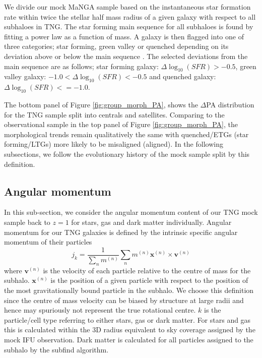 \documentclass[fleqn,usenatbib]{mnras}
\begin{document}
We divide our mock MaNGA sample based on the instantaneous star formation rate within twice the stellar half mass radius of a given galaxy with respect to all subhaloes in TNG. The star forming main sequence for all subhaloes is found by fitting a power law as a function of mass. A galaxy is then flagged into one of three categories; star forming, green valley or quenched depending on its deviation above or below the main sequence \citep{pillepich2019}. The selected deviations from the main sequence are as follows; star forming galaxy: $\Delta \log_{10}(SFR) > −0.5$, green valley galaxy: $-1.0 < \Delta \log_{10}(SFR) < -0.5$ and quenched galaxy: $\Delta \log_{10}(SFR) <= -1.0$.

The bottom panel of Figure \ref{fig:group_morph_PA}, shows the $\Delta$PA distribution for the TNG sample split into centrals and satellites. Comparing to the observational sample in the top panel of Figure \ref{fig:group_morph_PA}, the morphological trends remain qualitatively the same with quenched/ETGs (star forming/LTGs) more likely to be misaligned (aligned). In the following subsections, we follow the evolutionary history of the mock sample split by this definition. 

\subsection{Angular momentum}
In this sub-section, we consider the angular momentum content of our TNG mock sample back to $z=1$ for stars, gas and dark matter individually. Angular momentum for our TNG galaxies is defined by the intrinsic specific angular momentum of their particles
\begin{equation}
j_{k} = \frac{1}{\sum_{n} m^{(n)}} \sum_{n} m^{(n)}\boldsymbol{x}^{(n)} \times \boldsymbol{v}^{(n)}
\end{equation}
where $\boldsymbol{v}^{(n)}$ is the velocity of each particle relative to the centre of mass for the subhalo. $\boldsymbol{x}^{(n)}$ is the position of a given particle with respect to the position of the most gravitationally bound particle in the subhalo. We choose this definition since the centre of mass velocity can be biased by structure at large radii and hence may spuriously not represent the true rotational centre. $k$ is the particle/cell type referring to either stars, gas or dark matter. For stars and gas this is calculated within the 3D radius equivalent to sky coverage assigned by the mock IFU observation. Dark matter is calculated for all particles assigned to the subhalo by the subfind algorithm. 
\end{document}
